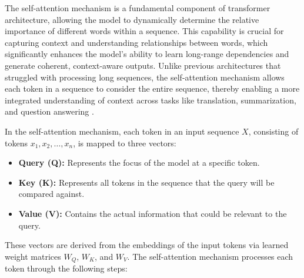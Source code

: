 The self-attention mechanism is a fundamental component of transformer architecture, allowing the model to dynamically determine the relative importance of different words within a sequence. This capability is crucial for capturing context and understanding relationships between words, which significantly enhances the model's ability to learn long-range dependencies and generate coherent, context-aware outputs. Unlike previous architectures that struggled with processing long sequences, the self-attention mechanism allows each token in a sequence to consider the entire sequence, thereby enabling a more integrated understanding of context across tasks like translation, summarization, and question answering \cite{vaswani2017attention}.

In the self-attention mechanism, each token in an input sequence \( X \), consisting of tokens \( x_1, x_2, \ldots, x_n \), is mapped to three vectors:

\begin{itemize}
    \item \textbf{Query (Q):} Represents the focus of the model at a specific token.
    \item \textbf{Key (K):} Represents all tokens in the sequence that the query will be compared against.
    \item \textbf{Value (V):} Contains the actual information that could be relevant to the query.
\end{itemize}

These vectors are derived from the embeddings of the input tokens via learned weight matrices \( W_Q \), \( W_K \), and \( W_V \). The self-attention mechanism processes each token through the following steps:

